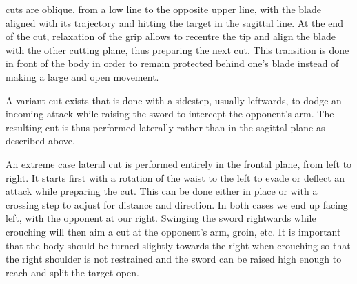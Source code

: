 \Liao{} cuts are oblique, from a low line to the opposite upper line, with the blade aligned with its trajectory and hitting the target in the sagittal line. At the end of the cut, relaxation of the grip allows to recentre the tip and align the blade with the other cutting plane, thus preparing the next \Liao{} cut. This transition is done in front of the body in order to remain protected behind one's blade instead of making a large and open movement. 

A variant \Liao{} cut exists that is done with a sidestep, usually leftwards, to dodge an incoming attack while raising the sword to intercept the opponent's arm. The resulting cut is thus performed laterally rather than in the sagittal plane as described above.

An extreme case lateral \Liao{} cut is performed entirely in the frontal plane, from left to right. It starts first with a rotation of the waist to the left to evade or deflect an attack while preparing the cut. This can be done either in place or with a crossing step to adjust for distance and direction. In both cases we end up facing left, with the opponent at our right. Swinging the sword rightwards while crouching will then aim a \Liao{} cut at the opponent's arm, groin, etc. It is important that the body should be turned slightly towards the right  when crouching so that the right shoulder is not restrained and the sword can be raised high enough to reach and split the target open. 




